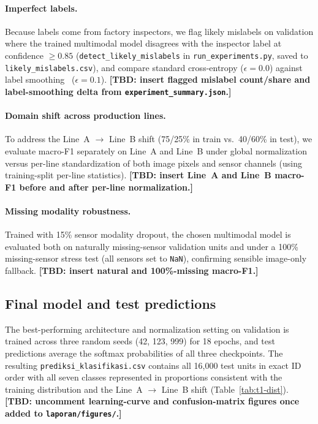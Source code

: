 \paragraph{Imperfect labels.} Because labels come from factory inspectors, we flag likely mislabels
on validation where the trained multimodal model disagrees with the inspector label at confidence
$\ge 0.85$ (\texttt{detect\_likely\_mislabels} in \texttt{run\_experiments.py}, saved to
\texttt{likely\_mislabels.csv}), and compare standard cross-entropy ($\epsilon=0.0$) against label
smoothing~\cite{szegedy2016} ($\epsilon=0.1$). \textbf{[TBD: insert flagged mislabel count/share and
label-smoothing delta from \texttt{experiment\_summary.json}.]}

\paragraph{Domain shift across production lines.} To address the Line~A $\to$ Line~B shift (75/25\%
in train vs.\ 40/60\% in test), we evaluate macro-F1 separately on Line~A and Line~B under global
normalization versus per-line standardization of both image pixels and sensor channels (using
training-split per-line statistics). \textbf{[TBD: insert Line~A and Line~B macro-F1 before and after
per-line normalization.]}

\paragraph{Missing modality robustness.} Trained with 15\% sensor modality dropout, the chosen
multimodal model is evaluated both on naturally missing-sensor validation units and under a 100\%
missing-sensor stress test (all sensors set to \texttt{NaN}), confirming sensible image-only
fallback. \textbf{[TBD: insert natural and 100\%-missing macro-F1.]}

\subsection{Final model and test predictions}
\label{sec:t1-final}

The best-performing architecture and normalization setting on validation is trained across three
random seeds (42, 123, 999) for 18 epochs, and test predictions average the softmax probabilities of
all three checkpoints. The resulting \texttt{prediksi\_klasifikasi.csv} contains all 16{,}000 test
units in exact ID order with all seven classes represented in proportions consistent with the
training distribution and the Line~A $\to$ Line~B shift (Table~\ref{tab:t1-dist}).
\textbf{[TBD: uncomment learning-curve and confusion-matrix figures once added to
\texttt{laporan/figures/}.]}

